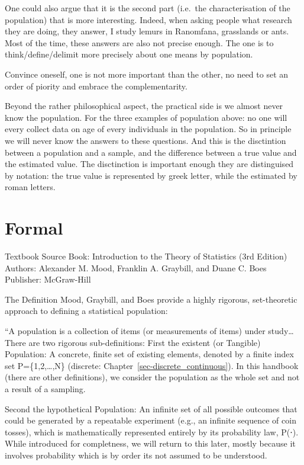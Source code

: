 \documentclass[
  letterpaper,
  DIV=11,
  numbers=noendperiod]{scrreprt}
\begin{document}
One could also argue that it is the second part (i.e.~the
characterisation of the population) that is more interesting. Indeed,
when asking people what research they are doing, they answer, I study
lemurs in Ranomfana, grasslands or ants. Most of the time, these answers
are also not precise enough. The one is to think/define/delimit more
precisely about one means by population.

Convince oneself, one is not more important than the other, no need to
set an order of piority and embrace the complementarity.

Beyond the rather philosophical aspect, the practical side is we almost
never know the population. For the three examples of population above:
no one will every collect data on age of every individuals in the
population. So in principle we will never know the answers to these
questions. And this is the disctintion between a population and a
sample, and the difference between a true value and the estimated value.
The disctinction is important enough they are distinguised by notation:
the true value is represented by greek letter, while the estimated by
roman letters.

\section*{Formal}\label{formal-14}


Textbook Source Book: Introduction to the Theory of Statistics (3rd
Edition) Authors: Alexander M. Mood, Franklin A. Graybill, and Duane C.
Boes Publisher: McGraw-Hill

The Definition Mood, Graybill, and Boes provide a highly rigorous,
set-theoretic approach to defining a statistical population:

``A population is a collection of items (or measurements of items) under
study\ldots There are two rigorous sub-definitions: First the existent
(or Tangible) Population: A concrete, finite set of existing elements,
denoted by a finite index set P=\{1,2,\ldots,N\} (discrete:
Chapter~\ref{sec-discrete_continuous}). In this handbook (there are
other definitions), we consider the population as the whole set and not
a result of a sampling.

Second the hypothetical Population: An infinite set of all possible
outcomes that could be generated by a repeatable experiment (e.g., an
infinite sequence of coin tosses), which is mathematically represented
entirely by its probability law, P(⋅). While introduced for completness,
we will return to this later, mostly because it involves probability
which is by order its not assumed to be understood.
\end{document}
